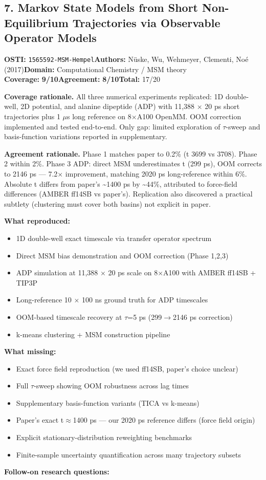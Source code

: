 \documentclass[11pt]{article}
\newcommand{\scorebadge}[2]{\textbf{#1:} \textbf{#2/10}}
\begin{document}
\subsection{7. Markov State Models from Short Non-Equilibrium Trajectories via Observable Operator Models}
\textbf{OSTI:} \texttt{1565592-MSM-Hempel}\quad\textbf{Authors:} N\"uske, Wu, Wehmeyer, Clementi, No\'e (2017)\quad\textbf{Domain:} Computational Chemistry / MSM theory\\
\scorebadge{Coverage}{9}\quad\scorebadge{Agreement}{8}\quad\textbf{Total:} 17/20\par\smallskip
\noindent\textbf{Coverage rationale.} All three numerical experiments replicated: 1D double-well, 2D potential, and alanine dipeptide (ADP) with 11,388 $\times$ 20 ps short trajectories plus 1 $\mu$s long reference on 8$\times$A100 OpenMM. OOM correction implemented and tested end-to-end. Only gap: limited exploration of $\tau$-sweep and basis-function variations reported in supplementary.\par
\noindent\textbf{Agreement rationale.} Phase 1 matches paper to 0.2\% (t 3699 vs 3708). Phase 2 within 2\%. Phase 3 ADP: direct MSM underestimates t (299 ps), OOM corrects to 2146 ps --- 7.2$\times$ improvement, matching 2020 ps long-reference within 6\%. Absolute t differs from paper's \textasciitilde{}1400 ps by \textasciitilde{}44\%, attributed to force-field differences (AMBER ff14SB vs paper's). Replication also discovered a practical subtlety (clustering must cover both basins) not explicit in paper.\par\smallskip
\noindent\textbf{What reproduced:}
\begin{itemize}[leftmargin=1.4em,itemsep=0.2em,topsep=0.2em]
\item 1D double-well exact timescale via transfer operator spectrum
\item Direct MSM bias demonstration and OOM correction (Phase 1,2,3)
\item ADP simulation at 11,388 $\times$ 20 ps scale on 8$\times$A100 with AMBER ff14SB + TIP3P
\item Long-reference 10 $\times$ 100 ns ground truth for ADP timescales
\item OOM-based timescale recovery at $\tau$=5 ps (299$\rightarrow$2146 ps correction)
\item k-means clustering + MSM construction pipeline
\end{itemize}\noindent\textbf{What missing:}
\begin{itemize}[leftmargin=1.4em,itemsep=0.2em,topsep=0.2em]
\item Exact force field reproduction (we used ff14SB, paper's choice unclear)
\item Full $\tau$-sweep showing OOM robustness across lag times
\item Supplementary basis-function variants (TICA vs k-means)
\item Paper's exact t$\approx$1400 ps --- our 2020 ps reference differs (force field origin)
\item Explicit stationary-distribution reweighting benchmarks
\item Finite-sample uncertainty quantification across many trajectory subsets
\end{itemize}\noindent\textbf{Follow-on research questions:}
\end{document}

